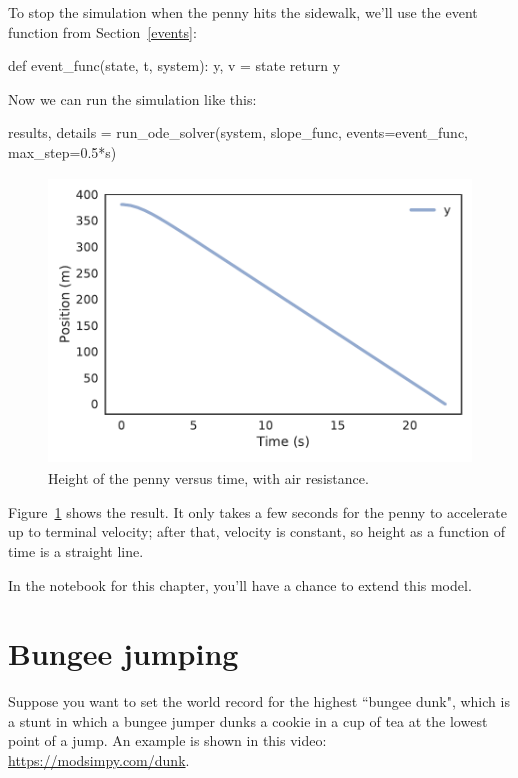 \documentclass[12pt]{book}
\theoremstyle{exercise}
\newcommand{\py}{\verb}%}
\begin{document}
To stop the simulation when the penny hits the sidewalk, we'll use the event function from Section~\ref{events}:

\begin{python}
def event_func(state, t, system):
    y, v = state
    return y
\end{python}

Now we can run the simulation like this:

\index{\py{run_ode_solver}}

\begin{python}
results, details = run_ode_solver(system, slope_func,
                       events=event_func, max_step=0.5*s)
\end{python}

\begin{figure}
\centerline{\includegraphics[height=3in]{figs/chap09-fig02.pdf}}
\caption{Height of the penny versus time, with air resistance.}
\label{chap09-fig02}
\end{figure}

Figure~\ref{chap09-fig02} shows the result.  It only takes a few seconds for the penny to accelerate up to terminal velocity; after that, velocity is constant, so height as a function of time is a straight line.


In the notebook for this chapter, you'll have a chance to extend this model.


\section{Bungee jumping}
\label{bungee}

Suppose you want to set the world record for the highest ``bungee dunk", which is a stunt in which a bungee jumper dunks a cookie in a cup of tea at the lowest point of a jump.  An example is shown in this video: \url{https://modsimpy.com/dunk}.
\end{document}
